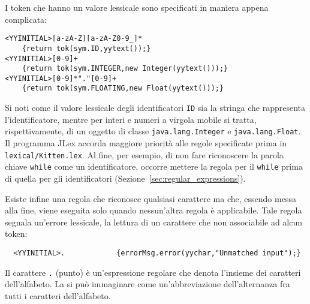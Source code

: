 I token che hanno un valore lessicale sono specificati in maniera appena \piu
complicata:
%
\begin{verbatim}
<YYINITIAL>[a-zA-Z][a-zA-Z0-9_]*
    {return tok(sym.ID,yytext());}
<YYINITIAL>[0-9]+
    {return tok(sym.INTEGER,new Integer(yytext()));}
<YYINITIAL>[0-9]*"."[0-9]+
    {return tok(sym.FLOATING,new Float(yytext()));}
\end{verbatim}
%
Si noti come il valore lessicale degli identificatori \texttt{ID} sia
la stringa che rappresenta l'identificatore, mentre per interi e numeri
a virgola mobile si tratta, rispettivamente,
di un oggetto di classe \texttt{java.lang.Integer} e \texttt{java.lang.Float}.
Il programma JLex accorda maggiore priorit\`a alle regole
specificate prima in \texttt{lexical/Kitten.lex}. Al fine, per esempio, di non
fare riconoscere la parola chiave \texttt{while} come un
identificatore, occorre mettere la regola per il \texttt{while}
prima di quella per gli identificatori (Sezione~\ref{sec:regular_expressions}).

Esiste infine una regola che riconosce qualsiasi carattere ma che, essendo
messa alla fine, viene eseguita solo quando nessun'altra regola
\`e applicabile. Tale regola segnala un'errore lessicale, \cioe
la lettura di un carattere che non \e associabile ad alcun token:
%
\begin{verbatim}
  <YYINITIAL>.            {errorMsg.error(yychar,"Unmatched input");}
\end{verbatim}
%
Il carattere \texttt{.} (punto) \`e un'espressione regolare che denota
l'insieme dei caratteri dell'alfabeto. La si pu\`o immaginare come
un'abbreviazione dell'alternanza fra tutti i caratteri dell'alfabeto.
%
%
